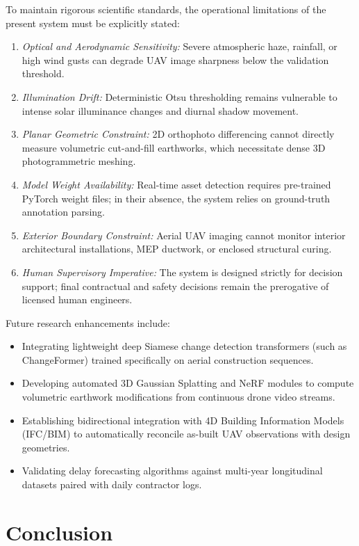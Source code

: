 \documentclass[conference]{IEEEtran}
\begin{document}
To maintain rigorous scientific standards, the operational limitations of the present system must be explicitly stated:
\begin{enumerate}
    \item \textit{Optical and Aerodynamic Sensitivity:} Severe atmospheric haze, rainfall, or high wind gusts can degrade UAV image sharpness below the validation threshold.
    \item \textit{Illumination Drift:} Deterministic Otsu thresholding remains vulnerable to intense solar illuminance changes and diurnal shadow movement.
    \item \textit{Planar Geometric Constraint:} 2D orthophoto differencing cannot directly measure volumetric cut-and-fill earthworks, which necessitate dense 3D photogrammetric meshing.
    \item \textit{Model Weight Availability:} Real-time asset detection requires pre-trained PyTorch weight files; in their absence, the system relies on ground-truth annotation parsing.
    \item \textit{Exterior Boundary Constraint:} Aerial UAV imaging cannot monitor interior architectural installations, MEP ductwork, or enclosed structural curing.
    \item \textit{Human Supervisory Imperative:} The system is designed strictly for decision support; final contractual and safety decisions remain the prerogative of licensed human engineers.
\end{enumerate}

Future research enhancements include:
\begin{itemize}
    \item Integrating lightweight deep Siamese change detection transformers (such as ChangeFormer) trained specifically on aerial construction sequences.
    \item Developing automated 3D Gaussian Splatting and NeRF modules to compute volumetric earthwork modifications from continuous drone video streams.
    \item Establishing bidirectional integration with 4D Building Information Models (IFC/BIM) to automatically reconcile as-built UAV observations with design geometries.
    \item Validating delay forecasting algorithms against multi-year longitudinal datasets paired with daily contractor logs.
\end{itemize}

\section{Conclusion}
\end{document}
